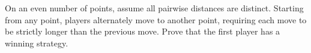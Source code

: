 On an even number of points, assume all pairwise distances are distinct. Starting from any point, players alternately move to another point, requiring each move to be strictly longer than the previous move. Prove that the first player has a winning strategy.
